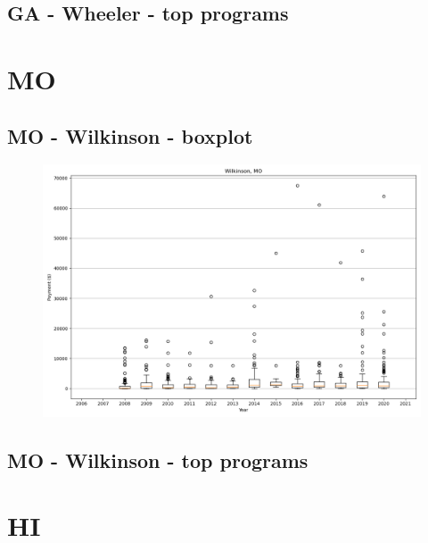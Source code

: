 \subsection*{GA - Wheeler - top programs}

\newpage
\section*{MO}
\subsection*{MO - Wilkinson - boxplot}
\begin{figure}[h]
\centering
\includegraphics[width=7in]{../output/boxplots/counties/Wilkinson-MO_boxplot.png}
\end{figure}


\subsection*{MO - Wilkinson - top programs}

\newpage
\section*{HI}
